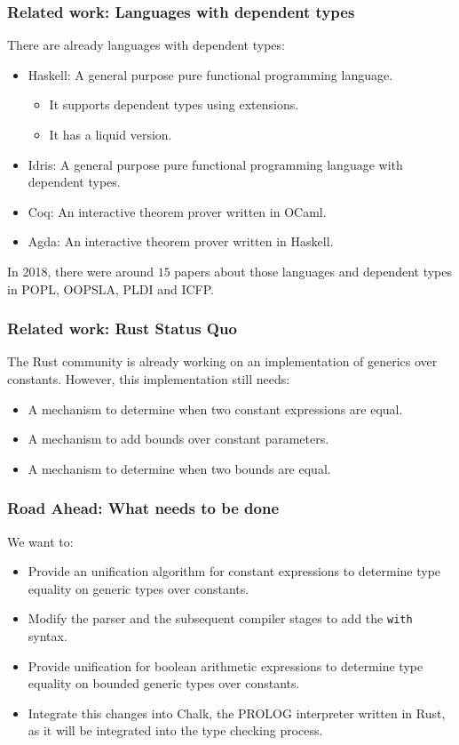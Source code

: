 \documentclass{beamer}
\newcommand{\code}[1] {\texttt{\footnotesize #1}}
\begin{document}
\begin{frame}[fragile]
    \frametitle{Related work: Languages with dependent types}
    There are already languages with dependent types:
    \begin{itemize}
        \item Haskell: A general purpose pure functional programming language.
            \begin{itemize}
                \item It supports dependent types using extensions.
                \item It has a liquid version.
            \end{itemize}
        \item Idris: A general purpose pure functional programming language with dependent types.
        \item Coq: An interactive theorem prover written in OCaml.
        \item Agda: An interactive theorem prover written in Haskell.
    \end{itemize}
    In 2018, there were around $15$ papers about those languages and dependent types in POPL, OOPSLA, PLDI and ICFP.
\end{frame}

\begin{frame}[fragile]
    \frametitle{Related work: Rust Status Quo}
    The Rust community is already working on an implementation of generics over constants. However, this implementation still needs:
    \begin{itemize}
        \item A mechanism to determine when two constant expressions are equal.
        \item A mechanism to add bounds over constant parameters.
        \item A mechanism to determine when two bounds are equal.
    \end{itemize}
\end{frame}

\begin{frame}[fragile]
    \frametitle{Road Ahead: What needs to be done}
    We want to:
    \begin{itemize}
        \item Provide an unification algorithm for constant expressions to determine type equality on generic types over constants.
        \item Modify the parser and the subsequent compiler stages to add the \code{with} syntax.
        \item Provide unification for boolean arithmetic expressions to determine type equality on bounded generic types over constants.
        \item Integrate this changes into Chalk, the PROLOG interpreter written in Rust, as it will be integrated into the type checking process.
    \end{itemize}
\end{frame}
\end{document}

